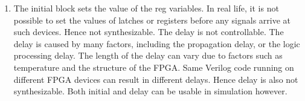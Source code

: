 \documentclass[11pt,letterpaper,titlepage]{article}
\begin{document}
\begin{enumerate}
\begin{enumerate}
        \item The initial block sets the value of the reg variables. In real life, it is not possible to set the values of latches or registers before any signals arrive at such devices. Hence not synthesizable. The delay is not controllable. The delay is caused by many factors, including the propagation delay, or the logic processing delay. The length of the delay can vary due to factors such as temperature and the structure of the FPGA. Same Verilog code running on different FPGA devices can result in different delays. Hence delay is also not synthesizable. Both initial and delay can be usable in simulation however.
        
    \end{enumerate}
    
\end{enumerate}
\end{document}
